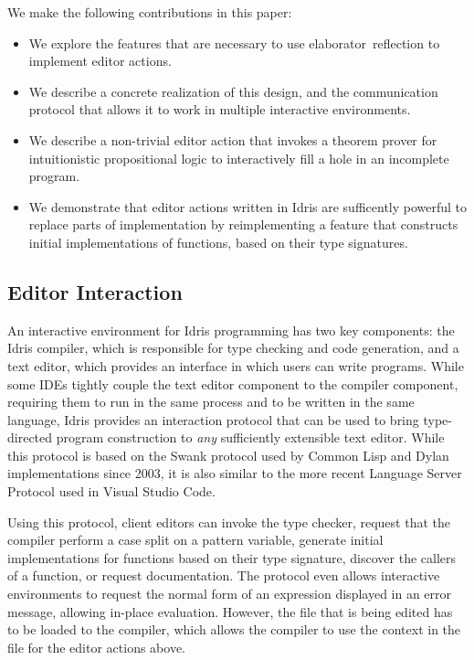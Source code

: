 
We make the following contributions in this paper:

\begin{itemize}[topsep=0pt , leftmargin=10pt]
\item We explore the features that are necessary to use
  \mbox{elaborator reflection} to implement editor actions.
\item We describe a concrete realization of this design, and the
  communication protocol that allows it to work in multiple
  interactive environments.
\item We describe a non-trivial editor action that invokes a
  theorem prover for intuitionistic propositional logic to
  interactively fill a hole in an incomplete
  program.
\item We demonstrate that editor actions written in Idris are
  sufficently powerful to replace parts of implementation by
  reimplementing a feature that constructs initial implementations of
  functions, based on their type signatures.
\end{itemize}

\subsection{Editor Interaction}

An interactive environment for Idris programming has two key
components: the Idris compiler, which is responsible for type checking
and code generation, and a text editor, which provides an interface in
which users can write programs. While some IDEs tightly couple the
text editor component to the compiler component, requiring them to run
in the same process and to be written in the same language, Idris
provides an interaction protocol that can be used to bring
type-directed program construction to \emph{any} sufficiently
extensible text editor. While this protocol is based on the Swank
protocol used by Common Lisp and Dylan implementations since 2003, it
is also similar to the more recent Language Server Protocol
used in Visual Studio Code.

Using this protocol, client editors can invoke the type checker,
request that the compiler perform a case split on a pattern variable,
generate initial implementations for functions based on their type
signature, discover the callers of a function, or request
documentation. The protocol even allows interactive environments to
request the normal form of an expression displayed in an error
message, allowing in-place evaluation. However, the file that is being edited
has to be loaded to the compiler, which allows the compiler to use the context
in the file for the editor actions above.

